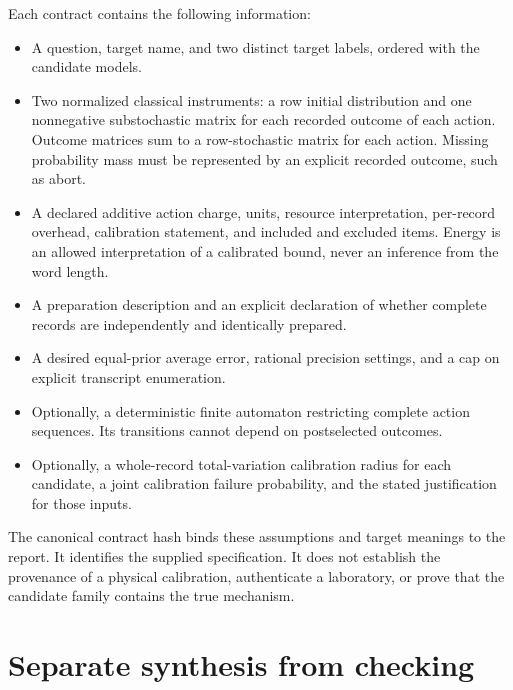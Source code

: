 Each contract contains the following information:
\begin{itemize}
\item A question, target name, and two distinct target labels, ordered with
the candidate models.
\item Two normalized classical instruments: a row initial distribution and
one nonnegative substochastic matrix for each recorded outcome of each
action. Outcome matrices sum to a row-stochastic matrix for each action.
Missing probability mass must be represented by an explicit recorded
outcome, such as abort.
\item A declared additive action charge, units, resource interpretation,
per-record overhead, calibration statement, and included and excluded
items. Energy is an allowed interpretation of a calibrated bound, never
an inference from the word length.
\item A preparation description and an explicit declaration of whether
complete records are independently and identically prepared.
\item A desired equal-prior average error, rational precision settings, and
a cap on explicit transcript enumeration.
\item Optionally, a deterministic finite automaton restricting complete
action sequences. Its transitions cannot depend on postselected outcomes.
\item Optionally, a whole-record total-variation calibration radius for
each candidate, a joint calibration failure probability, and the stated
justification for those inputs.
\end{itemize}

The canonical contract hash binds these assumptions and target meanings to
the report. It identifies the supplied specification. It does not establish
the provenance of a physical calibration, authenticate a laboratory, or
prove that the candidate family contains the true mechanism.

\section{Separate synthesis from checking}

